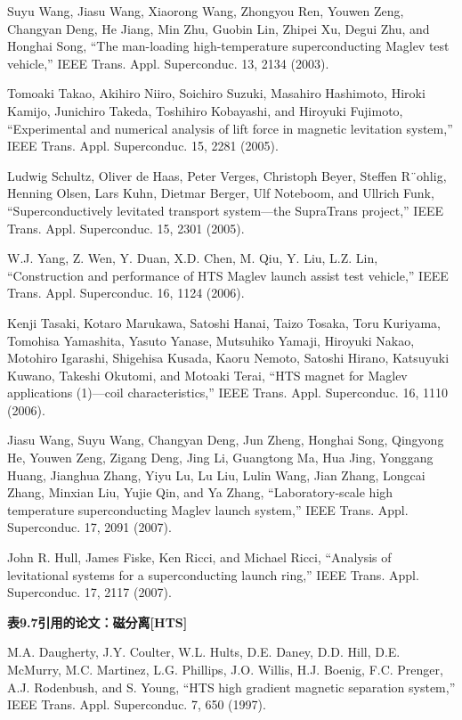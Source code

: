 \noindent [9.252] Suyu Wang, Jiasu Wang, Xiaorong Wang, Zhongyou Ren, Youwen Zeng, Changyan
Deng, He Jiang, Min Zhu, Guobin Lin, Zhipei Xu, Degui Zhu, and Honghai
Song, ``The man-loading high-temperature superconducting Maglev test vehicle,”
IEEE Trans. Appl. Superconduc. 13, 2134 (2003).

\noindent [9.253] Tomoaki Takao, Akihiro Niiro, Soichiro Suzuki, Masahiro Hashimoto, Hiroki
Kamijo, Junichiro Takeda, Toshihiro Kobayashi, and Hiroyuki Fujimoto, ``Experimental
and numerical analysis of lift force in magnetic levitation system,”
IEEE Trans. Appl. Superconduc. 15, 2281 (2005).

\noindent [9.254] Ludwig Schultz, Oliver de Haas, Peter Verges, Christoph Beyer, Steffen R¨ohlig,
Henning Olsen, Lars Kuhn, Dietmar Berger, Ulf Noteboom, and Ullrich Funk,
``Superconductively levitated transport system—the SupraTrans project,” IEEE
Trans. Appl. Superconduc. 15, 2301 (2005).

\noindent [9.255] W.J. Yang, Z. Wen, Y. Duan, X.D. Chen, M. Qiu, Y. Liu, L.Z. Lin, ``Construction
and performance of HTS Maglev launch assist test vehicle,” IEEE Trans. Appl.
Superconduc. 16, 1124 (2006).

\noindent [9.256] Kenji Tasaki, Kotaro Marukawa, Satoshi Hanai, Taizo Tosaka, Toru Kuriyama,
Tomohisa Yamashita, Yasuto Yanase, Mutsuhiko Yamaji, Hiroyuki Nakao, Motohiro
Igarashi, Shigehisa Kusada, Kaoru Nemoto, Satoshi Hirano, Katsuyuki Kuwano,
Takeshi Okutomi, and Motoaki Terai, ``HTS magnet for Maglev applications
(1)—coil characteristics,” IEEE Trans. Appl. Superconduc. 16, 1110 (2006).

\noindent [9.257] Jiasu Wang, Suyu Wang, Changyan Deng, Jun Zheng, Honghai Song, Qingyong
He, Youwen Zeng, Zigang Deng, Jing Li, Guangtong Ma, Hua Jing, Yonggang
Huang, Jianghua Zhang, Yiyu Lu, Lu Liu, Lulin Wang, Jian Zhang, Longcai
Zhang, Minxian Liu, Yujie Qin, and Ya Zhang, ``Laboratory-scale high temperature
superconducting Maglev launch system,” IEEE Trans. Appl. Superconduc.
17, 2091 (2007).

\noindent [9.258] John R. Hull, James Fiske, Ken Ricci, and Michael Ricci, ``Analysis of levitational
systems for a superconducting launch ring,” IEEE Trans. Appl. Superconduc. 17,
2117 (2007).

\noindent \textbf{表9.7引用的论文：磁分离[HTS] }

\noindent [9.259] M.A. Daugherty, J.Y. Coulter, W.L. Hults, D.E. Daney, D.D. Hill, D.E. McMurry,
M.C. Martinez, L.G. Phillips, J.O. Willis, H.J. Boenig, F.C. Prenger, A.J. Rodenbush,
and S. Young, ``HTS high gradient magnetic separation system,” IEEE
Trans. Appl. Superconduc. 7, 650 (1997).

